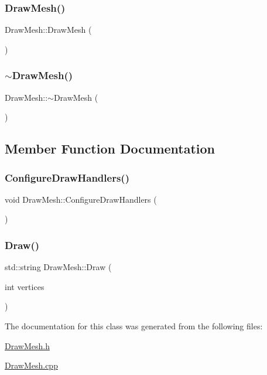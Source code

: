 \subsubsection{\texorpdfstring{DrawMesh()}{DrawMesh()}}
{\footnotesize\ttfamily Draw\+Mesh\+::\+Draw\+Mesh (\begin{DoxyParamCaption}{ }\end{DoxyParamCaption})}

\mbox{\label{class_draw_mesh_ab4abfd945c517dc323a27b372450bd74}} 
\subsubsection{\texorpdfstring{$\sim$DrawMesh()}{~DrawMesh()}}
{\footnotesize\ttfamily Draw\+Mesh\+::$\sim$\+Draw\+Mesh (\begin{DoxyParamCaption}{ }\end{DoxyParamCaption})}



\subsection{Member Function Documentation}
\mbox{\label{class_draw_mesh_ab095d024d70e38ae188307e14256b590}} 
\subsubsection{\texorpdfstring{ConfigureDrawHandlers()}{ConfigureDrawHandlers()}}
{\footnotesize\ttfamily void Draw\+Mesh\+::\+Configure\+Draw\+Handlers (\begin{DoxyParamCaption}{ }\end{DoxyParamCaption})}

\mbox{\label{class_draw_mesh_a5bb39b5c9cd69fd5c4decee6a875ca5a}} 
\subsubsection{\texorpdfstring{Draw()}{Draw()}}
{\footnotesize\ttfamily std\+::string Draw\+Mesh\+::\+Draw (\begin{DoxyParamCaption}\item[{int}]{vertices }\end{DoxyParamCaption})}



The documentation for this class was generated from the following files\+:\begin{DoxyCompactItemize}
\item 
\mbox{\hyperlink{_draw_mesh_8h}{Draw\+Mesh.\+h}}\item 
\mbox{\hyperlink{_draw_mesh_8cpp}{Draw\+Mesh.\+cpp}}\end{DoxyCompactItemize}
